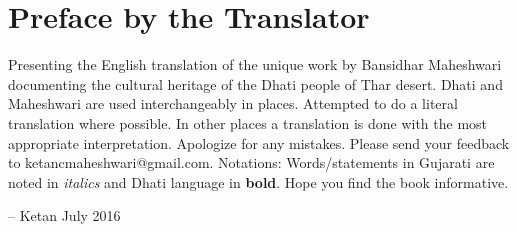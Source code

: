 \chapter*{Preface by the Translator}

Presenting the English translation of the unique work by Bansidhar Maheshwari
documenting the cultural heritage of the Dhati people of Thar desert. Dhati and
Maheshwari are used interchangeably in places. Attempted to do a literal
translation where possible. In other places a translation is done with the most
appropriate interpretation. Apologize for any mistakes. Please send your
feedback to ketancmaheshwari@gmail.com. Notations: Words/statements in Gujarati
are noted in \textit{italics} and Dhati language in \textbf{bold}.  Hope you
find the book informative.

--
Ketan
July 2016
